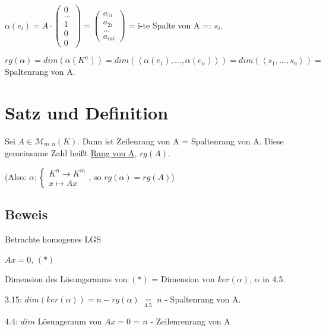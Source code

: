 \documentclass[a4paper, openany]{book}
\begin{document}
        \begin{center}
          $\alpha(e_i) = A \cdot \begin{pmatrix}0 \\ ... \\ 1 \\ 0 \\ 0 \end{pmatrix} = \begin{pmatrix}a_{1i} \\ a_{2i} \\ ... \\ a_{mi}\end{pmatrix}$ = i-te Spalte von A =: $s_i$.
        \end{center}

        $rg(\alpha) = dim(\alpha(K^n)) = dim(\left \langle \alpha(e_1), ..., \alpha(e_n) \right \rangle) = dim(\left \langle s_1, ..., s_n \right \rangle) = $ Spaltenrang von A.

        \section{Satz und Definition}

        Sei $A \in \mathcal{M}_{m,n} (K)$. Dann ist Zeilenrang von A = Spaltenrang von A. Diese gemeinsame Zahl heißt \underline{Rang von A}, $rg(A)$.

        (Also: $\alpha : \begin{cases}K^n \rightarrow K^m \\ x \mapsto Ax \end{cases}$, so $rg(\alpha) = rg(A)$)

        \subsection{Beweis}

        Betrachte homogenes LGS

        \begin{center}
          $Ax = 0$, $(*)$
        \end{center}

        Dimension des Lösungsraums von $(*)$ = Dimension von $ker(\alpha)$, $\alpha$ in 4.5.

        3.15: $dim(ker(\alpha)) = n - rg(\alpha)$ $\underset{4.5}{=}$ $n$ - Spaltenrang von A.

        4.4: $dim$ Lösungsraum von $Ax = 0$ = $n$ - Zeilenrenrang von A

        \par \medskip
\end{document}
